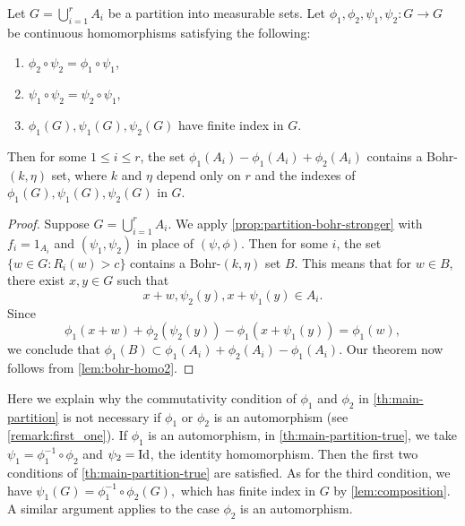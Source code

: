 \begin{theorem}\label{th:main-partition-true}
Let $G=\bigcup_{i=1}^r A_i$ be a partition into measurable sets. Let $\phi_1, \phi_2, \psi_1, \psi_2: G \rightarrow G$ be continuous homomorphisms satisfying the following:
\begin{enumerate}
\item $\phi_2 \circ \psi_2 = \phi_1 \circ \psi_1$,
\item $\psi_1 \circ \psi_2 = \psi_2 \circ \psi_1$,
\item $\phi_1(G), \psi_1(G), \psi_2(G)$ have finite index in $G$.
\end{enumerate}
Then for some $1 \leq i \leq r$, the set $\phi_1(A_i) - \phi_1(A_i) + \phi_2(A_i)$ contains a Bohr-$(k, \eta)$ set, where $k$ and $\eta$ depend only on $r$ and the indexes of $\phi_1(G), \psi_1(G), \psi_2(G)$ in $G$.
\end{theorem}

\begin{proof}
Suppose $G = \bigcup_{i=1}^r A_i$. We apply \cref{prop:partition-bohr-stronger} with $f_i = 1_{A_i}$ and $(\psi_1, \psi_2)$ in place of $(\psi, \phi)$. Then for some $i$, the set $\{ w \in G: R_i(w) > c\}$ contains a Bohr-$(k,\eta)$ set $B$. This means that for $w \in B$, there exist $x, y \in G$ such that
\[
x+w, \psi_2(y), x + \psi_1(y) \in A_i.
\]
Since
\[
\phi_1(x+w) + \phi_2( \psi_2(y)) - \phi_1( x + \psi_1(y)) = \phi_1(w),
\]
we conclude that $\phi_1(B) \subset \phi_1(A_i) + \phi_2(A_i) - \phi_1(A_i)$. Our theorem now follows from \cref{lem:bohr-homo2}.
\end{proof}


\begin{remark} \label{rk:auto2}
Here we explain why the commutativity condition of $\phi_1$ and $\phi_2$ in \cref{th:main-partition} is not necessary if $\phi_1$ or $\phi_2$ is an automorphism (see \cref{remark:first_one}). If $\phi_1$ is an automorphism, in \cref{th:main-partition-true}, we take $\psi_1 = \phi_1^{-1} \circ \phi_2$ and $\psi_2 = \textup{Id}$, the identity homomorphism. Then the first two conditions of \cref{th:main-partition-true} are satisfied. As for the third condition, we have $\psi_1(G) = \phi_1^{-1} \circ \phi_2(G),$ which has finite index in $G$ by \cref{lem:composition}. A similar argument applies to the case $\phi_2$ is an automorphism.
\end{remark}
